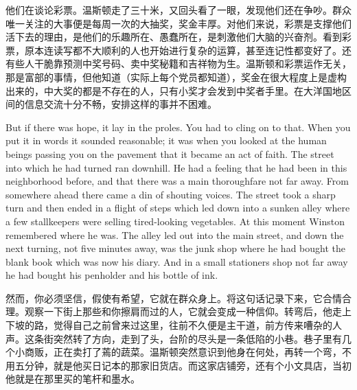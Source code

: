 \begin{paracol}{2}
\switchcolumn

他们在谈论彩票。温斯顿走了三十米，又回头看了一眼，发现他们还在争吵。群众唯一关注的大事便是每周一次的大抽奖，奖金丰厚。对他们来说，彩票是支撑他们活下去的理由，是他们的乐趣所在、愚蠢所在，是刺激他们大脑的兴奋剂。看到彩票，原本连读写都不大顺利的人也开始进行复杂的运算，甚至连记性都变好了。还有些人干脆靠预测中奖号码、卖中奖秘籍和吉祥物为生。温斯顿和彩票运作无关，那是富部的事情，但他知道（实际上每个党员都知道），奖金在很大程度上是虚构出来的，中大奖的都是不存在的人，只有小奖才会发到中奖者手里。在大洋国地区间的信息交流十分不畅，安排这样的事并不困难。

\switchcolumn*

But if there was hope, it lay in the proles. You had to cling on to
that. When you put it in words it sounded reasonable; it was when you
looked at the human beings passing you on the pavement that it became an
act of faith. The street into which he had turned ran downhill. He had a
feeling that he had been in this neighborhood before, and that there was
a main thoroughfare not far away. From somewhere ahead there came a din
of shouting voices. The street took a sharp turn and then ended in a
flight of steps which led down into a sunken alley where a few
stallkeepers were selling tired-looking vegetables. At this moment
Winston remembered where he was. The alley led out into the main street,
and down the next turning, not five minutes away, was the junk shop
where he had bought the blank book which was now his diary. And in a
small stationer\textquotesingle s shop not far away he had bought his
penholder and his bottle of ink.

\switchcolumn

然而，你必须坚信，假使有希望，它就在群众身上。将这句话记录下来，它合情合理。观察一下街上那些和你擦肩而过的人，它就会变成一种信仰。转弯后，他走上下坡的路，觉得自己之前曾来过这里，往前不久便是主干道，前方传来嘈杂的人声。这条街突然转了方向，走到了头，台阶的尽头是一条低陷的小巷。巷子里有几个小商贩，正在卖打了蔫的蔬菜。温斯顿突然意识到他身在何处，再转一个弯，不用五分钟，就是他买日记本的那家旧货店。而这家店铺旁，还有个小文具店，当初他就是在那里买的笔杆和墨水。

\switchcolumn*


\end{paracol}

